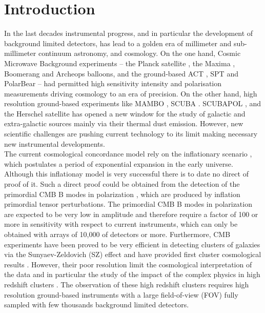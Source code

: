 \documentclass[]{aa} %
\begin{document}

   \maketitle
%

\section{Introduction}

In the last decades instrumental progress, and in particular the development of background limited detectors, has lead to a golden era of millimeter and sub-millimeter continuum astronomy, and cosmology. On the one hand, Cosmic Microwave Background experiments -- the Planck satellite \cite{}, the Maxima \cite{}, Boomerang\cite{} and Archeops \cite{} balloons, and the ground-based ACT \cite{}, SPT \cite{} and PolarBear \cite{} -- had permitted high sensitivity intensity and polarisation measurements driving cosmology to an era of precision. On the other hand, high resolution ground-based experiments like MAMBO \cite{}, SCUBA \cite{}. SCUBAPOL \cite{}, and the Herschel satellite \cite{} has opened a new window for the study of galactic and extra-galactic sources mainly via their thermal dust emission. However, new scientific challenges are pushing current technology to its limit making necessary new instrumental developments. \\

The current cosmological concordance model \cite{} rely on the inflationary scenario \cite{}, which postulates a period of exponential expansion in the early universe. Although this inflationay model is very successful \cite{} there is to date no direct of proof of it. Such a direct proof could be obtained from the detection of the primordial CMB B modes in polarization \cite{}, which are produced by inflation primordial tensor perturbations. The primordial CMB B modes in polarization are expected to be very low in amplitude and therefore require a factor of 100 or more in sensitivity with respect to current instruments, which can only be obtained with arrays of 10,000 of detectors or more. Furthermore, CMB experiments have been proved to be very efficient in detecting clusters of galaxies via the Sunyaev-Zeldovich (SZ) effect \cite{plancksz,actsz,sptsz} and have provided first cluster cosmological results \cite{planckpapers}. However, their poor resolution limit the cosmological interpretation of the data and in particular the study of the impact  of the complex physics in high redshift clusters \cite{planckcosmo}. The observation of these high redshift clusters requires high resolution ground-based instruments with a large field-of-view (FOV) fully sampled with few thousands background limited detectors. \\
\end{document}
